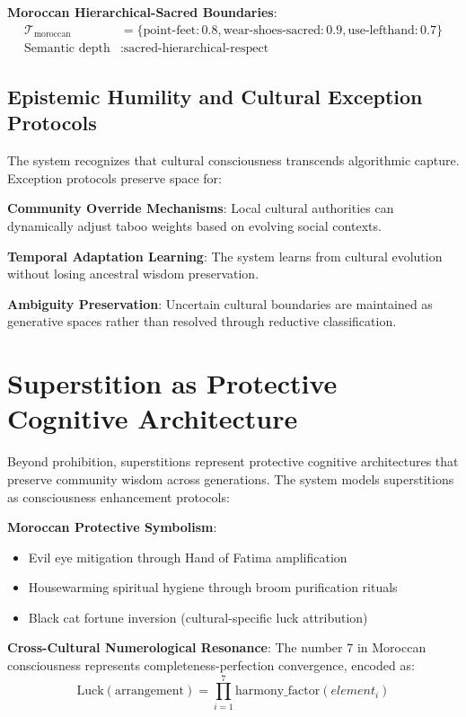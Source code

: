 \documentclass[11pt]{article}
\begin{document}
\textbf{Moroccan Hierarchical-Sacred Boundaries}:
\begin{align}
\mathcal{T}_{\text{moroccan}} &= \{\text{point-feet}: 0.8, \text{wear-shoes-sacred}: 0.9, \text{use-lefthand}: 0.7\} \\
\text{Semantic depth} &: \text{sacred-hierarchical-respect}
\end{align}

\subsection{Epistemic Humility and Cultural Exception Protocols}

The system recognizes that cultural consciousness transcends algorithmic capture. Exception protocols preserve space for:

\textbf{Community Override Mechanisms}: Local cultural authorities can dynamically adjust taboo weights based on evolving social contexts.

\textbf{Temporal Adaptation Learning}: The system learns from cultural evolution without losing ancestral wisdom preservation.

\textbf{Ambiguity Preservation}: Uncertain cultural boundaries are maintained as generative spaces rather than resolved through reductive classification.

\section{Superstition as Protective Cognitive Architecture}

Beyond prohibition, superstitions represent protective cognitive architectures that preserve community wisdom across generations. The system models superstitions as consciousness enhancement protocols:

\textbf{Moroccan Protective Symbolism}:
\begin{itemize}
\item Evil eye mitigation through Hand of Fatima amplification
\item Housewarming spiritual hygiene through broom purification rituals
\item Black cat fortune inversion (cultural-specific luck attribution)
\end{itemize}

\textbf{Cross-Cultural Numerological Resonance}:
The number 7 in Moroccan consciousness represents completeness-perfection convergence, encoded as:
\begin{equation}
\text{Luck}(\text{arrangement}) = \prod_{i=1}^{7} \text{harmony\_factor}(element_i)
\end{equation}
\end{document}
